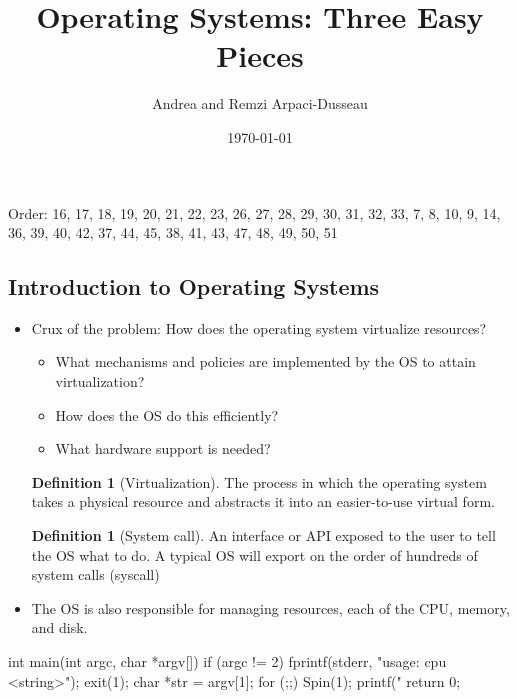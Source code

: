 \documentclass[11pt, a4paper]{article}
\title{Operating Systems: Three Easy Pieces}
\author{Andrea and Remzi Arpaci-Dusseau}
\date{\today}
\theoremstyle{definition}
\newtheorem{definition}[theorem]{Definition}
\theoremstyle{remark}
\begin{document}
\maketitle
\tableofcontents          %
Order: 16, 17, 18, 19, 20, 21, 22, 23, 26, 27, 28, 29, 30, 31, 32, 33, 7, 8, 10, 9, 14, 36, 39, 40, 42, 37, 44, 45, 38, 41, 43, 47, 48, 49, 50, 51
\newpage
\subsection{Introduction to Operating Systems}
\begin{itemize}
  \item Crux of the problem: How does the operating system virtualize resources?
  \begin{itemize}
    \item What mechanisms and policies are implemented by the OS to attain virtualization?
    \item How does the OS do this efficiently?
    \item What hardware support is needed?
  \end{itemize}
  \begin{definition}[Virtualization]
    The process in which the operating system takes a physical resource and abstracts it into an easier-to-use virtual form.
  \end{definition}
  \begin{definition}[System call]
    An interface or API exposed to the user to tell the OS what to do. A typical OS will export on the order of hundreds of system calls (syscall) 
  \end{definition}
  \item The OS is also responsible for managing resources, each of the CPU, memory, and disk.
\end{itemize}
\begin{ccode}
int main(int argc, char *argv[]) {
  if (argc != 2) { 
    fprintf(stderr, "usage: cpu <string>\n");
    exit(1);
  }
  char *str = argv[1];
  for (;;) {
    Spin(1);
    printf("%
  }
  return 0;
}
\end{ccode}
\end{document}
